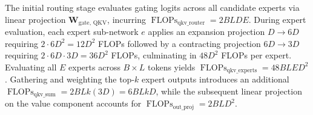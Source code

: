 \documentclass{article}
\begin{document}
The initial routing stage evaluates gating logits across all candidate experts via linear projection $\mathbf{W}_{\text{gate, QKV}}$, incurring $\operatorname{FLOPs}_{\text{qkv\_router}} = 2 B L D E$. During expert evaluation, each expert sub-network $e$ applies an expansion projection $D \to 6D$ requiring $2 \cdot 6 D^2 = 12 D^2$ FLOPs followed by a contracting projection $6D \to 3D$ requiring $2 \cdot 6D \cdot 3D = 36 D^2$ FLOPs, culminating in $48 D^2$ FLOPs per expert. Evaluating all $E$ experts across $B \times L$ tokens yields $\operatorname{FLOPs}_{\text{qkv\_experts}} = 48 B L E D^2$. Gathering and weighting the top-$k$ expert outputs introduces an additional $\operatorname{FLOPs}_{\text{qkv\_sum}} = 2 B L k (3D) = 6 B L k D$, while the subsequent linear projection on the value component accounts for $\operatorname{FLOPs}_{\text{out\_proj}} = 2 B L D^2$.
\end{document}
